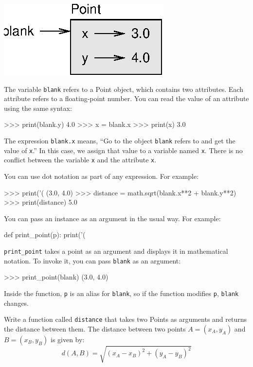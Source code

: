 \beforefig
\centerline{\includegraphics{figs/point.eps}}
\afterfig

The variable {\tt blank} refers to a Point object, which
contains two attributes.  Each attribute refers to a
floating-point number.
%
You can read the value of an attribute using the same syntax:

\beforeverb
\begin{pyinterpreter}
>>> print(blank.y)
4.0
>>> x = blank.x
>>> print(x)
3.0
\end{pyinterpreter}
\afterverb
%
The expression {\tt blank.x} means, ``Go to the object {\tt blank}
refers to and get the value of {\tt x}.'' In this case, we assign that
value to a variable named {\tt x}.  There is no conflict between
the variable {\tt x} and the attribute {\tt x}.

You can use dot notation as part of any expression.  For example:

\beforeverb
\begin{pyinterpreter}
>>> print('(%
(3.0, 4.0)
>>> distance = math.sqrt(blank.x**2 + blank.y**2)
>>> print(distance)
5.0
\end{pyinterpreter}
\afterverb
%
You can pass an instance as an argument in the usual way.
For example:


\beforeverb
\begin{pycode}
def print_point(p):
    print('(%
\end{pycode}
\afterverb
%
\verb"print_point" takes a point as an argument and displays it in
mathematical notation.  To invoke it, you can pass {\tt blank} as
an argument:

\beforeverb
\begin{pyinterpreter}
>>> print_point(blank)
(3.0, 4.0)
\end{pyinterpreter}
\afterverb
%
Inside the function, {\tt p} is an alias for {\tt blank}, so if
the function modifies {\tt p}, {\tt blank} changes.



\begin{exercise}
Write a function called {\tt distance} that takes two Points
as arguments and returns the distance between them. The distance between
two points $A=(x_A, y_A)$ and $B=(x_B, y_B)$ is given by:
\begin{equation}
d(A,B) = \sqrt{(x_A - x_B)^2 + (y_A - y_B)^2}
\label{eq:distance}
\end{equation}
\end{exercise}



